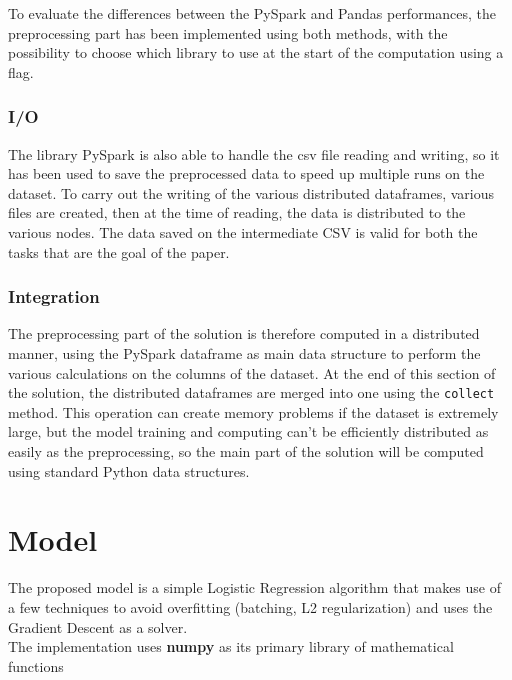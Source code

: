 \documentclass[
	letterpaper, %
	10pt, %
]{class}
\begin{document}
To evaluate the differences between the PySpark and Pandas performances, the preprocessing part has been implemented using both methods, with the possibility to choose which library to use at the start of the computation using a flag.

\subsubsection{I/O}

The library PySpark is also able to handle the csv file reading and writing, so it has been used to save the preprocessed data to speed up multiple runs on the dataset. To carry out the writing of the various distributed dataframes, various files are created, then at the time of reading, the data is distributed to the various nodes. The data saved on the intermediate CSV is valid for both the tasks that are the goal of the paper.\\

\subsubsection{Integration}

The preprocessing part of the solution is therefore computed in a distributed manner, using the PySpark dataframe as main data structure to perform the various calculations on the columns of the dataset.
At the end of this section of the solution, the distributed dataframes are merged into one using the \texttt{collect} method. This operation can create memory problems if the dataset is extremely large, but the model training and computing can't be efficiently distributed
as easily as the preprocessing, so the main part of the solution will be computed using standard Python data structures.


\section{Model}

The proposed model is a simple Logistic Regression \cite{logistic} algorithm that makes use of a few techniques to avoid overfitting (batching, L2 regularization) and uses the Gradient Descent as a solver.\\
The implementation uses \textbf{numpy} \cite{numpy} as its primary library of mathematical functions
\end{document}
